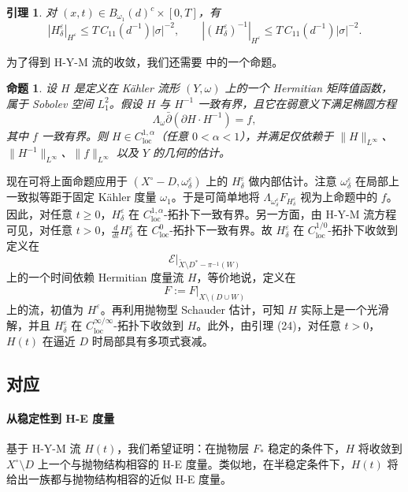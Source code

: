 \documentclass[12pt,a4paper]{article}
\newtheorem{lemma}[theorem]{引理}
\newtheorem{proposition}[theorem]{命题}
\begin{document}
\begin{lemma}
对 \((x,t)\in B_{\omega_1}(d)^c\times [0,T]\)，有
\[
|H^\varepsilon_\delta|_{H^\varepsilon}\le T\,C_{11}(d^{-1})|\sigma|^{-2},
\qquad
|(H^\varepsilon_\delta)^{-1}|_{H^\varepsilon}\le T\,C_{11}(d^{-1})|\sigma|^{-2}.
\]
\end{lemma}

为了得到 H-Y-M 流的收敛，我们还需要 \cite[Proposition 1]{BandoSiu} 中的一个命题。

\begin{proposition}
设 \(H\) 是定义在 Kähler 流形 \((Y,\omega)\) 上的一个 Hermitian 矩阵值函数，属于 Sobolev 空间 \(L_1^2\)。假设 \(H\) 与 \(H^{-1}\) 一致有界，且它在弱意义下满足椭圆方程
\[
\Lambda_\omega \bar\partial(\partial H\cdot H^{-1})=f,
\]
其中 \(f\) 一致有界。则 \(H\in C_{\mathrm{loc}}^{1,\alpha}\)（任意 \(0<\alpha<1\)），并满足仅依赖于 \(\|H\|_{L^\infty}\)、\(\|H^{-1}\|_{L^\infty}\)、\(\|f\|_{L^\infty}\) 以及 \(Y\) 的几何的估计。
\end{proposition}

现在可将上面命题应用于 \((X^\circ-D,\omega^\varepsilon_\delta)\) 上的 \(H^\varepsilon_\delta\) 做内部估计。注意 \(\omega^\varepsilon_\delta\) 在局部上一致拟等距于固定 Kähler 度量 \(\omega_1\)。于是可简单地将 \(\Lambda_{\omega^\varepsilon_\delta}F_{H^\varepsilon_\delta}\) 视为上命题中的 \(f\)。因此，对任意 \(t\ge 0\)，\(H^\varepsilon_\delta\) 在 \(C_{\mathrm{loc}}^{1,\alpha}\)-拓扑下一致有界。另一方面，由 H-Y-M 流方程可见，对任意 \(t>0\)，\(\frac{d}{dt}H^\varepsilon_\delta\) 在 \(C^0_{\mathrm{loc}}\)-拓扑下一致有界。故 \(H^\varepsilon_\delta\) 在 \(C^{1/0}_{\mathrm{loc}}\)-拓扑下收敛到定义在
\[
\mathcal E|_{\widetilde X\setminus D^*-\pi^{-1}(W)}
\]
上的一个时间依赖 Hermitian 度量流 \(H\)，等价地说，定义在
\[
F:=F|_{X\setminus(D\cup W)}
\]
上的流，初值为 \(H^\varepsilon\)。再利用抛物型 Schauder 估计，可知 \(H\) 实际上是一个光滑解，并且 \(H^\varepsilon_\delta\) 在 \(C_{\mathrm{loc}}^{\infty/\infty}\)-拓扑下收敛到 \(H\)。此外，由引理 (24)，对任意 \(t>0\)，\(H(t)\) 在逼近 \(D\) 时局部具有多项式衰减。

\subsection{对应}

\paragraph{从稳定性到 H-E 度量}
基于 H-Y-M 流 \(H(t)\)，我们希望证明：在抛物层 \(F_*\) 稳定的条件下，\(H\) 将收敛到 \(X^\circ\setminus D\) 上一个与抛物结构相容的 H-E 度量。类似地，在半稳定条件下，\(H(t)\) 将给出一族都与抛物结构相容的近似 H-E 度量。
\end{document}
